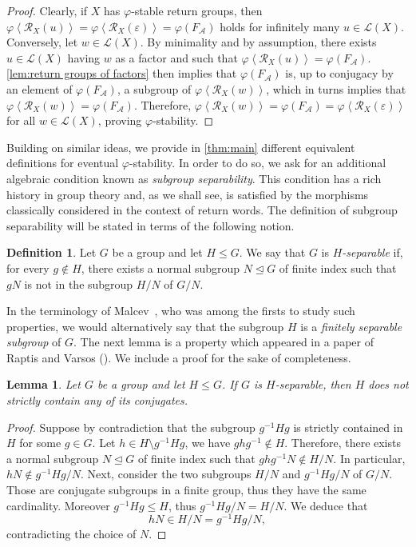 \documentclass{amsart}
\newcommand*{\ret}{\mathcal{R}}
\newcommand*{\lang}{\mathcal{L}}
\newcommand*{\cA}{\mathcal{A}}
\newcommand*{\emptyw}{\varepsilon}
\newcommand*{\gen}[1]{\left\langle #1\right\rangle}
\theoremstyle{plain}
\newtheorem{lemma}[theorem]{Lemma}
\theoremstyle{definition}
\newtheorem{definition}[theorem]{Definition}
\theoremstyle{remark}
\begin{document}
\begin{proof}
    Clearly, if $X$ has $\varphi$-stable return groups, then $\varphi\gen{\ret_X(u)} = \varphi\gen{\ret_X(\emptyw)} = \varphi(F_\cA)$ holds for infinitely many $u \in \lang(X)$. Conversely, let $w \in \lang(X)$. By minimality and by assumption, there exists $u \in \lang(X)$ having $w$ as a factor and such that $\varphi\gen{\ret_X(u)} = \varphi(F_\cA)$. \cref{lem:return groups of factors} then implies that $\varphi(F_\cA)$ is, up to conjugacy by an element of $\varphi(F_\cA)$, a subgroup of $\varphi\gen{\ret_X(w)}$, which in turns implies that $\varphi\gen{\ret_X(w)} = \varphi(F_\cA)$. Therefore, $\varphi\gen{\ret_X(w)} = \varphi(F_\cA) = \varphi\gen{\ret_X(\emptyw)}$ for all $w \in \lang(X)$, proving $\varphi$-stability.
\end{proof}

Building on similar ideas, we provide in \cref{thm:main} different equivalent definitions for eventual $\varphi$-stability. In order to do so, we ask for an additional algebraic condition known as \emph{subgroup separability}. This condition has a rich history in group theory and, as we shall see, is satisfied by the morphisms classically considered in the context of return words. The definition of subgroup separability will be stated in terms of the following notion.

\begin{definition}
    Let $G$ be a group and let $H \leq G$. We say that $G$ is \emph{$H$-separable} if, for every $g\notin H$, there exists a normal subgroup $N\trianglelefteq G$ of finite index such that $gN$ is not in the subgroup $H/N$ of $G/N$.
\end{definition}

In the terminology of Malcev~\cite{Malcev1983}, who was among the firsts to study such properties, we would alternatively say that the subgroup $H$ is a \emph{finitely separable subgroup} of $G$.
The next lemma is a property which appeared in a paper of Raptis and Varsos (\cite[Proposition~1]{Raptis1996}). We include a proof for the sake of completeness.
\begin{lemma}\label{lem:LERF}
    Let $G$ be a group and let $H\leq G$. If $G$ is $H$-separable, then $H$ does not strictly contain any of its conjugates.
\end{lemma}

\begin{proof}
    Suppose by contradiction that the subgroup $g^{-1}Hg$ is strictly contained in $H$ for some $g\in G$. Let $h\in H\setminus g^{-1}Hg$, we have $ghg^{-1} \notin H$. Therefore, there exists a normal subgroup $N \trianglelefteq G$ of finite index such that $ghg^{-1}N \notin H/N$. In particular, $hN \notin g^{-1}Hg/N$.  
    Next, consider the two subgroups $H/N$ and $g^{-1}Hg/N$ of $G/N$. Those are conjugate subgroups in a finite group, thus they have the same cardinality. Moreover $g^{-1}Hg\leq H$, thus $g^{-1}Hg/N = H/N$. We deduce that
    \begin{equation*}
        hN \in H/N = g^{-1}Hg/N,
    \end{equation*}
    contradicting the choice of $N$.
\end{proof}
\end{document}
